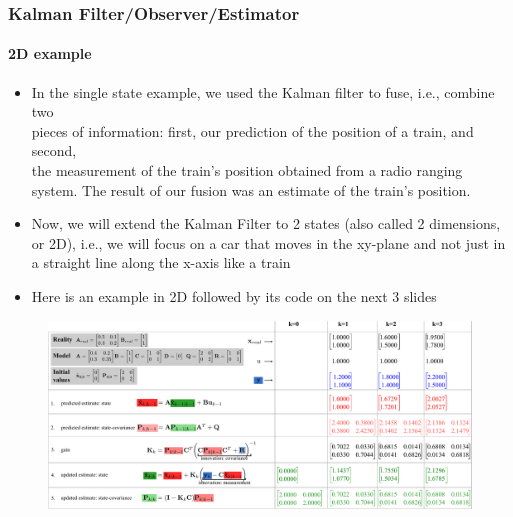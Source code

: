 \begin{frame}[plain]
\frametitle{Kalman Filter/Observer/Estimator}
\framesubtitle{2D example}

\begin{changemargin}{-1.4in}{0in}
\scriptsize
\begin{itemize}
\item In the single state example, we used the Kalman filter to fuse, i.e., combine two\\ pieces of information: first, our prediction of the position of a train, and second,\\ the measurement of the train's position obtained from a radio ranging system.  The result of our fusion was an estimate of the train's position.
\item Now, we will extend the Kalman Filter to 2 states (also called 2 dimensions, or 2D), i.e., we will focus on a car that moves in the xy-plane and not just in a straight line along the x-axis like a train
\item Here is an example in 2D followed by its code on the next 3 slides
\end{itemize}
\vspace{-0.18in}
\begin{figure}[h]
\centering
\includegraphics[width=1.4\textwidth]{figs/TRK_KalmanFilter_example.pdf}
\end{figure}
\end{changemargin}
\end{frame}



